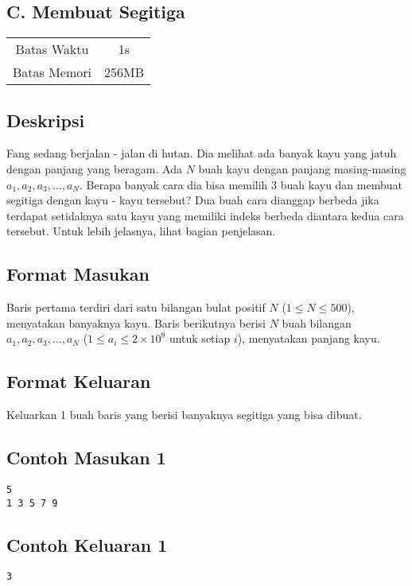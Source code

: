 \documentclass{article}
\begin{document}
\begin{center}
    \section*{C. Membuat Segitiga}

    \begin{tabular}{ | c c | }
        \hline
        Batas Waktu  & 1s \\    %
        Batas Memori & 256MB \\  %
        \hline
    \end{tabular}
\end{center}

\subsection*{Deskripsi}

Fang sedang berjalan - jalan di hutan. Dia melihat ada banyak kayu yang jatuh dengan panjang yang beragam. Ada $N$ buah kayu dengan panjang masing-masing $a_1, a_2, a_3, \dots, a_N$. Berapa banyak cara dia bisa memilih 3 buah kayu dan membuat segitiga dengan kayu - kayu tersebut? Dua buah cara dianggap berbeda jika terdapat setidaknya satu kayu yang memiliki indeks berbeda diantara kedua cara tersebut. Untuk lebih jelasnya, lihat bagian penjelasan.

\subsection*{Format Masukan}

Baris pertama terdiri dari satu bilangan bulat positif $N$ ($1 \leq N \leq 500$), menyatakan banyaknya kayu.
Baris berikutnya berisi $N$ buah bilangan $a_1, a_2, a_3, \dots, a_N$ ($1 \leq a_i \leq 2 \times 10^9$ untuk setiap $i$), menyatakan panjang kayu.

\subsection*{Format Keluaran}

Keluarkan 1 buah baris yang berisi banyaknya segitiga yang bisa dibuat.
\\

\begin{multicols}{2}
\subsection*{Contoh Masukan 1}
\begin{lstlisting}
5
1 3 5 7 9
\end{lstlisting}
\columnbreak
\subsection*{Contoh Keluaran 1}
\begin{lstlisting}
3
\end{lstlisting}
\vfill
\null
\end{multicols}
\end{document}
